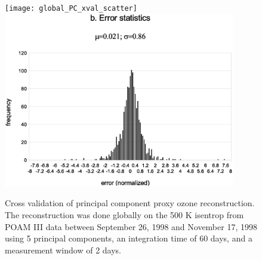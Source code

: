 \begin{figure}
  \centering
  \texttt{[image: global\_PC\_xval\_scatter]}
  \includegraphics[width=0.9\textwidth]{global_PC_xval_error}
  \caption{Cross validation of principal component proxy ozone reconstruction. The reconstruction was done globally on the 500 K isentrop from POAM III data between September 26, 1998 and November 17, 1998 using 5 principal components,  an integration time of 60 days, and a measurement window of 2 days.}
  \label{PC_cross_validation}
\end{figure}

